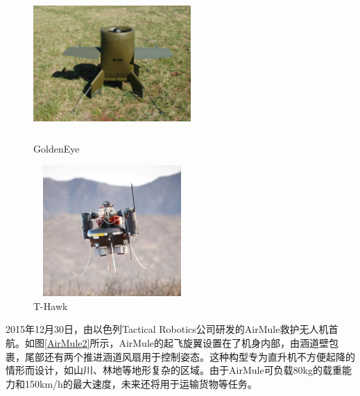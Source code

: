 \begin{figure}[htbp]
	\centering
	\begin{minipage}[c]{0.5\textwidth} %
		\centering
		\includegraphics[width=6cm,height=5cm]{Fig/GoldenEye.png}
		\caption{\label{GoldenEye}GoldenEye}
	\end{minipage}%
	\begin{minipage}[c]{0.5\textwidth}
		\centering
		\includegraphics[width=6cm,height=5cm]{Fig/T-Hawk.png}
		\caption{\label{T-Hawk}T-Hawk}
	\end{minipage}
\end{figure}

2015年12月30日，由以色列Tactical Robotics公司研发的AirMule救护无人机首航。如图\ref{AirMule2}所示，AirMule的起飞旋翼设置在了机身内部，由涵道壁包裹，尾部还有两个推进涵道风扇用于控制姿态。这种构型专为直升机不方便起降的情形而设计，如山川、林地等地形复杂的区域。由于AirMule可负载80kg的载重能力和150km/h的最大速度\cite{yuTechnicalAnalysisVTOL2016}，未来还将用于运输货物等任务。

